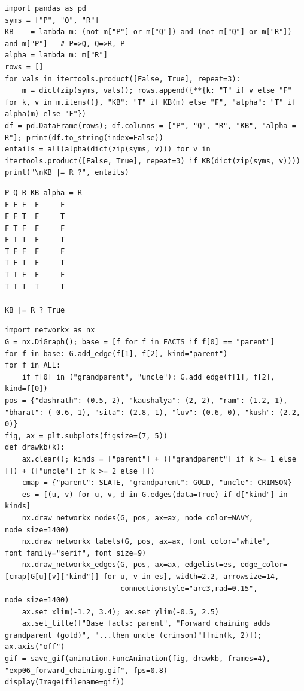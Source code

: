 \documentclass[11pt]{article}
\begin{document}
\begin{lstlisting}[style=py]
import pandas as pd
syms = ["P", "Q", "R"]
KB    = lambda m: (not m["P"] or m["Q"]) and (not m["Q"] or m["R"]) and m["P"]   # P=>Q, Q=>R, P
alpha = lambda m: m["R"]
rows = []
for vals in itertools.product([False, True], repeat=3):
    m = dict(zip(syms, vals)); rows.append({**{k: "T" if v else "F" for k, v in m.items()}, "KB": "T" if KB(m) else "F", "alpha": "T" if alpha(m) else "F"})
df = pd.DataFrame(rows); df.columns = ["P", "Q", "R", "KB", "alpha = R"]; print(df.to_string(index=False))
entails = all(alpha(dict(zip(syms, v))) for v in itertools.product([False, True], repeat=3) if KB(dict(zip(syms, v))))
print("\nKB |= R ?", entails)
\end{lstlisting}
\begin{lstlisting}[style=out]
P Q R KB alpha = R
F F F  F     F
F F T  F     T
F T F  F     F
F T T  F     T
T F F  F     F
T F T  F     T
T T F  F     F
T T T  T     T

KB |= R ? True
\end{lstlisting}
\begin{lstlisting}[style=py]
import networkx as nx
G = nx.DiGraph(); base = [f for f in FACTS if f[0] == "parent"]
for f in base: G.add_edge(f[1], f[2], kind="parent")
for f in ALL:
    if f[0] in ("grandparent", "uncle"): G.add_edge(f[1], f[2], kind=f[0])
pos = {"dashrath": (0.5, 2), "kaushalya": (2, 2), "ram": (1.2, 1), "bharat": (-0.6, 1), "sita": (2.8, 1), "luv": (0.6, 0), "kush": (2.2, 0)}
fig, ax = plt.subplots(figsize=(7, 5))
def drawkb(k):
    ax.clear(); kinds = ["parent"] + (["grandparent"] if k >= 1 else []) + (["uncle"] if k >= 2 else [])
    cmap = {"parent": SLATE, "grandparent": GOLD, "uncle": CRIMSON}
    es = [(u, v) for u, v, d in G.edges(data=True) if d["kind"] in kinds]
    nx.draw_networkx_nodes(G, pos, ax=ax, node_color=NAVY, node_size=1400)
    nx.draw_networkx_labels(G, pos, ax=ax, font_color="white", font_family="serif", font_size=9)
    nx.draw_networkx_edges(G, pos, ax=ax, edgelist=es, edge_color=[cmap[G[u][v]["kind"]] for u, v in es], width=2.2, arrowsize=14,
                           connectionstyle="arc3,rad=0.15", node_size=1400)
    ax.set_xlim(-1.2, 3.4); ax.set_ylim(-0.5, 2.5)
    ax.set_title(["Base facts: parent", "Forward chaining adds grandparent (gold)", "...then uncle (crimson)"][min(k, 2)]); ax.axis("off")
gif = save_gif(animation.FuncAnimation(fig, drawkb, frames=4), "exp06_forward_chaining.gif", fps=0.8)
display(Image(filename=gif))
\end{lstlisting}
\end{document}
